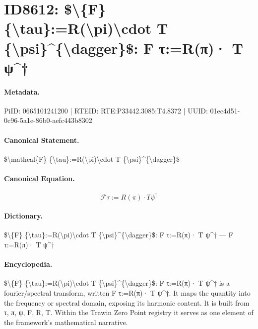 \section*{ID8612: \$\textbackslash{}\{F\} \{\textbackslash{}tau\}:=R(\textbackslash{}pi)\textbackslash{}cdot T \{\textbackslash{}psi\}\textasciicircum{}\{\textbackslash{}dagger\}\$: F τ:=R(π)· T ψ\textasciicircum{}†}
\paragraph{Metadata.}
PiID: 0665101241200 | RTEID: RTE:P33442.3085:T4.8372 | UUID: 01ec4d51-0c96-5a1e-86b0-aefc443b8302

\paragraph{Canonical Statement.}
\$\textbackslash{}mathcal\{F\} \{\textbackslash{}tau\}:=R(\textbackslash{}pi)\textbackslash{}cdot T \{\textbackslash{}psi\}\textasciicircum{}\{\textbackslash{}dagger\}\$

\paragraph{Canonical Equation.}
\[
\mathcal{F} {\tau}:=R(\pi)\cdot T {\psi}^{\dagger}
\]

\paragraph{Dictionary.}
\$\textbackslash{}\{F\} \{\textbackslash{}tau\}:=R(\textbackslash{}pi)\textbackslash{}cdot T \{\textbackslash{}psi\}\textasciicircum{}\{\textbackslash{}dagger\}\$: F τ:=R(π)· T ψ\textasciicircum{}† — F τ:=R(π)· T ψ\textasciicircum{}†

\paragraph{Encyclopedia.}
\$\textbackslash{}\{F\} \{\textbackslash{}tau\}:=R(\textbackslash{}pi)\textbackslash{}cdot T \{\textbackslash{}psi\}\textasciicircum{}\{\textbackslash{}dagger\}\$: F τ:=R(π)· T ψ\textasciicircum{}† is a fourier/spectral transform, written F τ:=R(π)· T ψ\textasciicircum{}†. It maps the quantity into the frequency or spectral domain, exposing its harmonic content. It is built from τ, π, ψ, F, R, T. Within the Trawin Zero Point registry it serves as one element of the framework's mathematical narrative.
